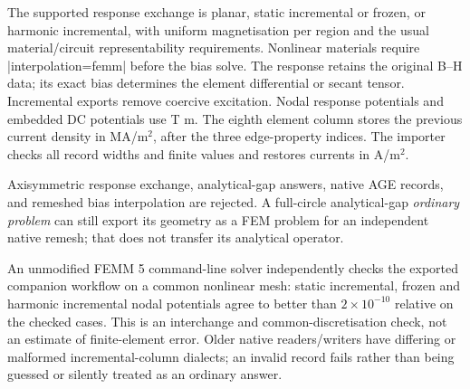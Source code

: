 The supported response exchange is planar, static incremental or frozen,
or harmonic incremental, with uniform magnetisation per region and the usual
material/circuit representability requirements. Nonlinear materials require
|interpolation=femm| before the bias solve. The response retains the original
B--H data; its exact bias determines the element differential or secant tensor.
Incremental exports remove coercive excitation. Nodal response potentials and
embedded DC potentials use T m. The eighth element column stores the previous
current density in MA/m$^2$, after the three edge-property indices. The importer
checks all record widths and finite values and restores currents in A/m$^2$.

Axisymmetric response exchange, analytical-gap answers, native AGE records,
and remeshed bias interpolation are rejected. A full-circle analytical-gap
\emph{ordinary problem} can still export its geometry as a FEM problem for an
independent native remesh; that does not transfer its analytical operator.

An unmodified FEMM 5 command-line solver independently checks the exported
companion workflow on a common nonlinear mesh: static incremental, frozen and
harmonic incremental nodal potentials agree to better than $2\times10^{-10}$
relative on the checked cases. This is an interchange and common-discretisation
check, not an estimate of finite-element error. Older native readers/writers
have differing or malformed incremental-column dialects; an invalid record
fails rather than being guessed or silently treated as an ordinary answer.
